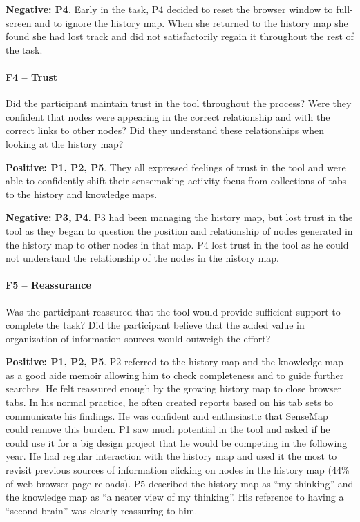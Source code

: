 \textbf{Negative: P4}. Early in the task, P4 decided to reset the browser window to full-screen and to ignore the history map. When she returned to the history map she found she had lost track and did not satisfactorily regain it throughout the rest of the task.

\paragraph{F4 -- Trust}
Did the participant maintain trust in the tool throughout the process? Were they confident that nodes were appearing in the correct relationship and with the correct links to other nodes? Did they understand these relationships when looking at the history map?

\textbf{Positive: P1, P2, P5}. They all expressed feelings of trust in the tool and were able to confidently shift their sensemaking activity focus from collections of tabs to the history and knowledge maps.

\textbf{Negative: P3, P4}. P3 had been managing the history map, but lost trust in the tool as they began to question the position and relationship of nodes generated in the history map to other nodes in that map. P4 lost trust in the tool as he could not understand the relationship of the nodes in the history map.

\paragraph{F5 -- Reassurance}
Was the participant reassured that the tool would provide sufficient support to complete the task? Did the participant believe that the added value in organization of information sources would outweigh the effort?

\textbf{Positive: P1, P2, P5}. P2 referred to the history map and the knowledge map as a good aide memoir allowing him to check completeness and to guide further searches. He felt reassured enough by the growing history map to close browser tabs. In his normal practice, he often created reports based on his tab sets to communicate his findings. He was confident and enthusiastic that SenseMap could remove this burden. P1 saw much potential in the tool and asked if he could use it for a big design project that he would be competing in the following year. He had regular interaction with the history map and used it the most to revisit previous sources of information clicking on nodes in the history map (44\% of web browser page reloads). P5 described the history map as ``my thinking'' and the knowledge map as ``a neater view of my thinking''. His reference to having a ``second brain'' was clearly reassuring to him.

